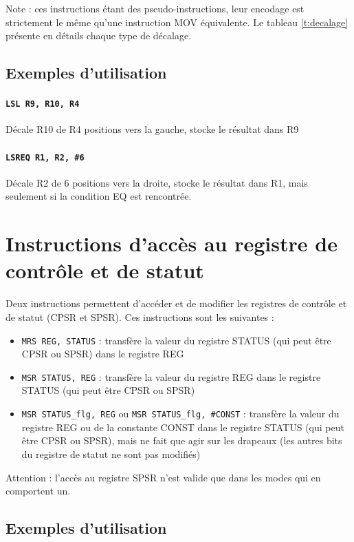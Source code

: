 \documentclass{tufte-handout}
\begin{document}
Note : ces instructions étant des pseudo-instructions, leur encodage est strictement le même qu'une instruction MOV équivalente. Le tableau \ref{t:decalage} présente en détails chaque type de décalage.

\subsection{Exemples d'utilisation}

\paragraph{\texttt{LSL R9, R10, R4}} Décale R10 de R4 positions vers la gauche, stocke le résultat dans R9

\paragraph{\texttt{LSREQ R1, R2, \#6}} Décale R2 de 6 positions vers la droite, stocke le résultat dans R1, mais seulement si la condition EQ est rencontrée.



\clearpage
\section{Instructions d'accès au registre de contrôle et de statut}

Deux instructions permettent d'accéder et de modifier les registres de contrôle et de statut (CPSR et SPSR). Ces instructions sont les suivantes :

\begin{itemize}
	\item \texttt{MRS REG, STATUS} : transfère la valeur du registre STATUS (qui peut être CPSR ou SPSR) dans le registre REG
	\item \texttt{MSR STATUS, REG} : transfère la valeur du registre REG dans le registre STATUS (qui peut être CPSR ou SPSR)
	\item \texttt{MSR STATUS\_flg, REG} ou \texttt{MSR STATUS\_flg, \#CONST} : transfère la valeur du registre REG ou de la constante CONST dans le registre STATUS (qui peut être CPSR ou SPSR), mais ne fait que agir sur les drapeaux (les autres bits du registre de statut ne sont pas modifiés)
\end{itemize}

Attention : l'accès au registre SPSR n'est valide que dans les modes qui en comportent un.

\subsection{Exemples d'utilisation}
\end{document}

